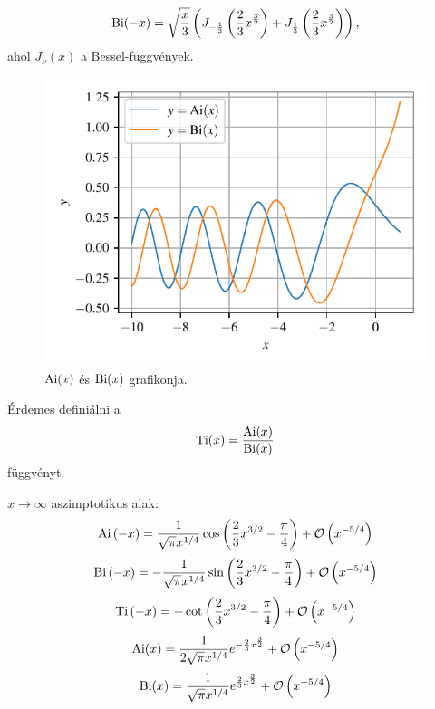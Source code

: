 \begin{equation}
	\operatorname{Bi}(-x) = \sqrt{\frac{x}{3}}\left(J_{-\frac{1}{3}}\left(\frac{2}{3}x^{\frac{3}{2}}\right)+J_{\frac{1}{3}}\left(\frac{2}{3}x^{\frac{3}{2}}\right)\right),
	\label{airy:bi-}
\end{equation}
ahol $J_\nu(x)$ a Bessel-függvények.
\begin{figure}
	\centering
	\includegraphics[scale=1]{./figs/airy.pdf}
	\caption[Airy-függvények]{$\operatorname{Ai}(x)$ és $\operatorname{Bi}(x)$ grafikonja.}
\end{figure}
Érdemes definiálni a
\begin{equation}
	\operatorname{Ti}(x) = \frac{\operatorname{Ai}(x)}{\operatorname{Bi}(x)}
\end{equation}
függvényt.

$x \to \infty$ aszimptotikus alak:
\begin{equation}
	\operatorname{Ai}\left(-x\right) = \frac{1}{\sqrt{\pi}x^{1/4}}\cos\left(\frac{2}{3}x^{3/2} - \frac{\pi}{4}\right) + \mathcal{O}\left(x^{-5/4}\right)
\end{equation}
\begin{equation}
	\operatorname{Bi}\left(-x\right) = -\frac{1}{\sqrt{\pi}x^{1/4}}\sin\left(\frac{2}{3}x^{3/2} - \frac{\pi}{4}\right) + \mathcal{O}\left(x^{-5/4}\right)
\end{equation}
\begin{equation}
	\operatorname{Ti}\left(-x\right) = -\cot\left( \frac{2}{3}x^{3/2} - \frac{\pi}{4} \right) + \mathcal{O}\left(x^{-5/4}\right)
\end{equation}
\begin{equation}
	\operatorname{Ai}(x) = \frac{1}{2\sqrt{\pi}x^{1/4}}e^{-\frac{2}{3}x^{\frac{3}{2}}}+\mathcal{O}\left(x^{-5/4}\right)
\end{equation}
\begin{equation}
	\operatorname{Bi}(x) = \frac{1}{ \sqrt{\pi}x^{1/4}}e^{ \frac{2}{3}x^{\frac{3}{2}}}+\mathcal{O}\left(x^{-5/4}\right)
\end{equation}

